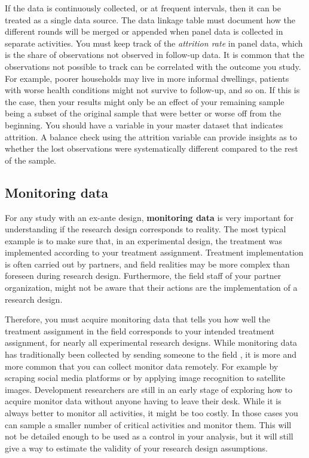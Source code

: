 If the data is continuously collected,
or at frequent intervals,
then it can be treated as a single data source.
The data linkage table must document
how the different rounds will be merged or appended
when panel data is collected in separate activities.
You must keep track of the \textit{attrition rate} in panel data,
which is the share of observations not observed in follow-up data.
It is common that the observations not possible to track
can be correlated with the outcome you study.
For example, poorer households may live in more informal dwellings,
patients with worse health conditions might not survive to follow-up,
and so on.
If this is the case,
then your results might only be an effect of your remaining sample
being a subset of the original sample
that were better or worse off from the beginning.
You should have a variable in your master dataset
 that indicates attrition.
A balance check using the attrition variable
can provide insights as to whether the lost observations
were systematically different
compared to the rest of the sample.

\subsection{Monitoring data}

For any study with an ex-ante design,
\textbf{monitoring data}
is very important for understanding if the
research design corresponds to reality.
The most typical example is to make sure that,
in an experimental design,
the treatment was implemented according to your treatment assignment.
Treatment implementation is often carried out by partners,
and field realities may be more complex than foreseen during research design.
Furthermore, the field staff of your partner organization,
might not be aware that their actions are the implementation of a research design.

Therefore, you must acquire monitoring data that
tells you how well the treatment assignment in the field
corresponds to your intended treatment assignment,
for nearly all experimental research designs.
While monitoring data has traditionally been collected by sending someone to the field ,
it is more and more common that you can collect monitor data remotely.
For example by scraping social media platforms
or by applying image recognition to satellite images.
Development researchers are still in an early stage
of exploring how to acquire monitor data
without anyone having to leave their desk.
While it is always better to monitor all activities,
it might be too costly.
In those cases you can sample a smaller number of critical activities and monitor them.
This will not be detailed enough to be used as a control in your analysis,
but it will still give a way to
estimate the validity of your research design assumptions.

